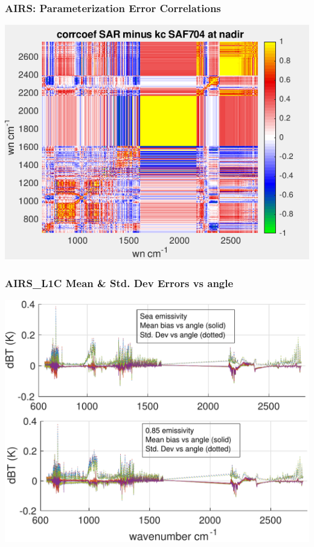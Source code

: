 \documentclass[10pt,t]{beamer}
\begin{document}
\begin{frame}
  \frametitle{AIRS:  Parameterization Error Correlations}
  \begin{center}
    \includegraphics[width=0.9\linewidth]{./Figs/Png/plot6_wavenumber_sorted.png}
  \end{center}
      
 \end{frame}

\begin{frame}
  \frametitle{AIRS\_L1C Mean \& Std. Dev Errors vs angle}

  \begin{center}
    \includegraphics[width=0.9\linewidth]{./Figs/Pdf/kc_sar_airs_l1c_mean_stdv_emiss_vs_angle_v2.pdf}
  \end{center}
  
  \end{frame}
\end{document}
